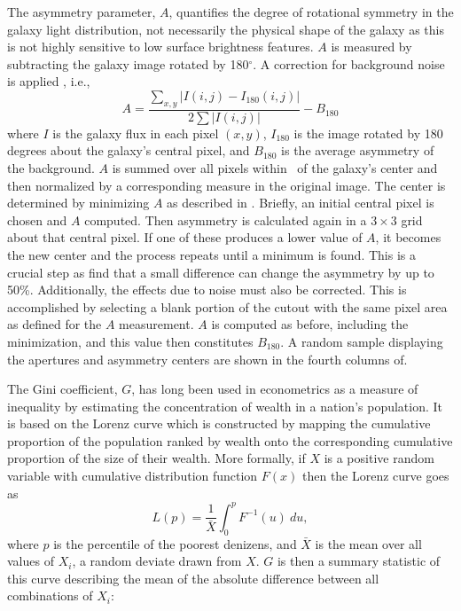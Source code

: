 The asymmetry parameter, $A$, quantifies the degree of rotational symmetry in the galaxy light distribution, not necessarily the physical shape of the galaxy as this is not highly sensitive to low surface brightness features. $A$ is measured by subtracting the galaxy image rotated by 180$^{\circ}$. A correction for background noise is applied \citep[as in e.g.,][]{Conselice2000, Lotz2004}, i.e., 
\begin{equation}\label{eqn: asymmetry}
A = \frac{\sum_{x,y} |I(i,j) - I_{180}(i,j)|}{ 2\sum|I(i,j)|} - B_{180}
\end{equation}
where $I$ is the galaxy flux in each pixel $(x, y)$, $I_{180}$ is the image rotated by 180 degrees about the galaxy's central pixel, and $B_{180}$ is the average asymmetry of the background. $A$ is summed over all pixels within \rp~of the galaxy's center and then normalized by a corresponding measure in the original image. The center is determined by minimizing $A$ as described in \cite{Conselice2000}. Briefly, an initial central pixel is chosen and $A$ computed. Then asymmetry is calculated again in a $3\times3$ grid about that central pixel. If one of these produces a lower value of $A$, it becomes the new center and the process repeats until a minimum is found. This is a crucial step as \cite{Conselice2000} find that a small difference can change the asymmetry by up to 50\%. Additionally, the effects due to noise must also be corrected. This is accomplished by selecting a blank portion of the cutout with the same pixel area as defined for the $A$ measurement.  $A$ is computed as before, including the minimization, and this value then constitutes $B_{180}$. A random sample displaying the apertures and asymmetry centers are shown in the fourth columns of. 

The Gini coefficient, $G$, has long been used in econometrics as a measure of inequality by estimating the concentration of wealth in a nation's population. It is based on the Lorenz curve \citep{Lorenz1905} which is constructed by mapping the cumulative proportion of the population ranked by wealth onto the corresponding cumulative proportion of the size of their wealth. More formally, if $X$ is a positive random variable with cumulative distribution function $F(x)$ then the Lorenz curve goes as   
\begin{equation}
L(p) = \frac{1}{\bar X}\int^p_0 F^{-1}(u)~du,
\end{equation}
where $p$ is the percentile of the poorest denizens, and $\bar X$ is the mean over all values of $X_i$, a random deviate drawn from $X$. $G$ is then a summary statistic of this curve describing the mean of the absolute difference between all combinations of $X_i$:

